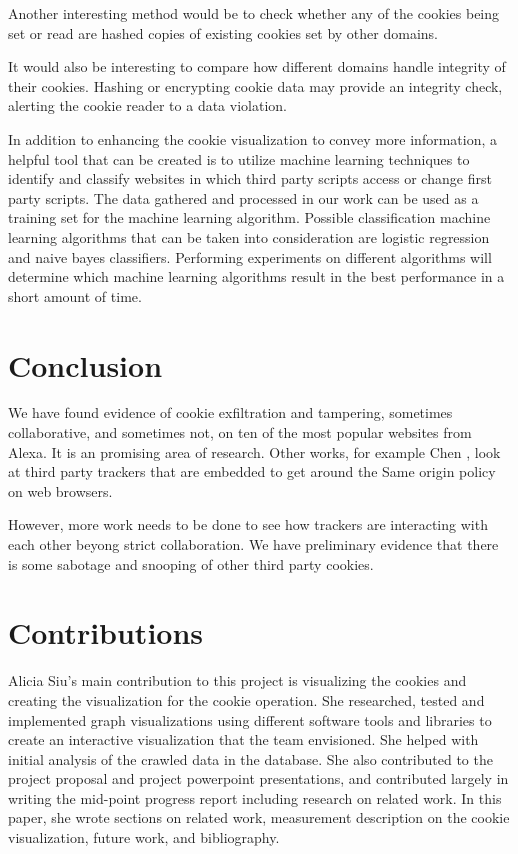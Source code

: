 \documentclass[sigplan,screen]{acmart}
\begin{document}
Another interesting method would be to check whether any of the cookies being set or read are hashed copies of existing cookies set by other domains.

It would also be interesting to compare how different domains handle integrity of their cookies. Hashing or encrypting cookie data may provide an integrity check, alerting the cookie reader to a data violation.

In addition to enhancing the cookie visualization to convey more information, a helpful tool that can be created is to utilize machine learning techniques to identify and classify websites in which third party scripts access or change first party scripts. The data gathered and processed in our work can be used as a training set for the machine learning algorithm. Possible classification machine learning algorithms that can be taken into consideration are logistic regression and naive bayes classifiers. Performing experiments on different algorithms will determine which machine learning algorithms result in the best performance in a short amount of time. 

\section{Conclusion}

We have found evidence of cookie exfiltration and tampering, sometimes collaborative, and sometimes not, on ten of the most popular websites from Alexa. It is an promising area of research. Other works, for example Chen \cite{chen2021cookie}, look at third party trackers that are embedded to get around the Same origin policy on web browsers. 

However, more work needs to be done to see how trackers are interacting with each other beyong strict collaboration. We have preliminary evidence that there  is some sabotage and snooping of other third party cookies.

\section{Contributions}

Alicia Siu's main contribution to this project is visualizing the cookies and creating the visualization for the cookie operation. She researched, tested and implemented graph visualizations using different software tools and libraries to create an interactive visualization that the team envisioned. She helped with initial analysis of the crawled data in the database. She also contributed to the project proposal and project powerpoint presentations, and contributed largely in writing the mid-point progress report including research on related work. In this paper, she wrote sections on related work, measurement description on the cookie visualization, future work, and bibliography.
\end{document}
